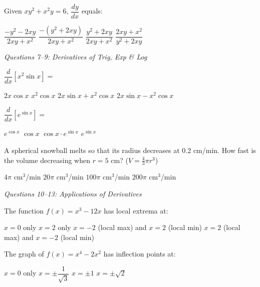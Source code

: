 \documentclass[addpoints]{exam}
\begin{document}
\begin{questions}
\question[1] Given $xy^2 + x^2y = 6$, $\dfrac{dy}{dx}$ equals:
\begin{choices}
    \choice $\dfrac{-y^2-2xy}{2xy+x^2}$
    \correctchoice $\dfrac{-(y^2+2xy)}{2xy+x^2}$
    \choice $\dfrac{y^2+2xy}{2xy+x^2}$
    \choice $\dfrac{2xy+x^2}{y^2+2xy}$
\end{choices}

\vspace{3mm}
\noindent\textit{Questions 7--9: Derivatives of Trig, Exp \& Log}
\vspace{3mm}

\question[1] $\dfrac{d}{dx}\!\left[x^2\sin x\right] = $
\begin{choices}
    \choice $2x\cos x$
    \choice $x^2\cos x$
    \correctchoice $2x\sin x + x^2\cos x$
    \choice $2x\sin x - x^2\cos x$
\end{choices}

\question[1] $\dfrac{d}{dx}\!\left[e^{\sin x}\right] = $
\begin{choices}
    \choice $e^{\cos x}$
    \choice $\cos x$
    \correctchoice $\cos x \cdot e^{\sin x}$
    \choice $e^{\sin x}$
\end{choices}

\question[1] A spherical snowball melts so that its radius decreases at 0.2 cm/min.
How fast is the volume decreasing when $r = 5$ cm? ($V = \tfrac{4}{3}\pi r^3$)
\begin{choices}
    \choice $4\pi$ cm$^3$/min
    \correctchoice $20\pi$ cm$^3$/min
    \choice $100\pi$ cm$^3$/min
    \choice $200\pi$ cm$^3$/min
\end{choices}

\vspace{3mm}
\noindent\textit{Questions 10--13: Applications of Derivatives}
\vspace{3mm}

\question[1] The function $f(x) = x^3 - 12x$ has local extrema at:
\begin{choices}
    \choice $x = 0$ only
    \choice $x = 2$ only
    \correctchoice $x = -2$ (local max) and $x = 2$ (local min)
    \choice $x = 2$ (local max) and $x = -2$ (local min)
\end{choices}

\question[1] The graph of $f(x) = x^4 - 2x^2$ has inflection points at:
\begin{choices}
    \choice $x = 0$ only
    \correctchoice $x = \pm\dfrac{1}{\sqrt{3}}$
    \choice $x = \pm 1$
    \choice $x = \pm\sqrt{2}$
\end{choices}


\end{questions}
\end{document}
